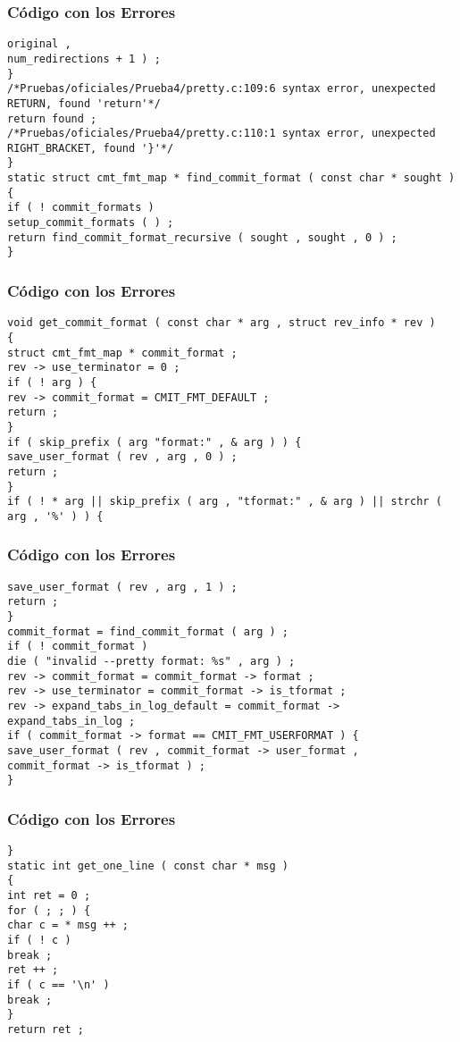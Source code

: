 \documentclass{beamer}
\begin{document}
\begin{frame}[fragile]
\frametitle{C\'odigo con los Errores}
\begin{verbatim}
original , 
num_redirections + 1 ) ; 
} 
/*Pruebas/oficiales/Prueba4/pretty.c:109:6 syntax error, unexpected RETURN, found 'return'*/
return found ; 
/*Pruebas/oficiales/Prueba4/pretty.c:110:1 syntax error, unexpected RIGHT_BRACKET, found '}'*/
} 
static struct cmt_fmt_map * find_commit_format ( const char * sought ) 
{ 
if ( ! commit_formats ) 
setup_commit_formats ( ) ; 
return find_commit_format_recursive ( sought , sought , 0 ) ; 
} 
\end{verbatim}
\end{frame}
\begin{frame}[fragile]
\frametitle{C\'odigo con los Errores}
\begin{verbatim}
void get_commit_format ( const char * arg , struct rev_info * rev ) 
{ 
struct cmt_fmt_map * commit_format ; 
rev -> use_terminator = 0 ; 
if ( ! arg ) { 
rev -> commit_format = CMIT_FMT_DEFAULT ; 
return ; 
} 
if ( skip_prefix ( arg "format:" , & arg ) ) { 
save_user_format ( rev , arg , 0 ) ; 
return ; 
} 
if ( ! * arg || skip_prefix ( arg , "tformat:" , & arg ) || strchr ( arg , '%' ) ) { 
\end{verbatim}
\end{frame}
\begin{frame}[fragile]
\frametitle{C\'odigo con los Errores}
\begin{verbatim}
save_user_format ( rev , arg , 1 ) ; 
return ; 
} 
commit_format = find_commit_format ( arg ) ; 
if ( ! commit_format ) 
die ( "invalid --pretty format: %s" , arg ) ; 
rev -> commit_format = commit_format -> format ; 
rev -> use_terminator = commit_format -> is_tformat ; 
rev -> expand_tabs_in_log_default = commit_format -> expand_tabs_in_log ; 
if ( commit_format -> format == CMIT_FMT_USERFORMAT ) { 
save_user_format ( rev , commit_format -> user_format , 
commit_format -> is_tformat ) ; 
} 
\end{verbatim}
\end{frame}
\begin{frame}[fragile]
\frametitle{C\'odigo con los Errores}
\begin{verbatim}
} 
static int get_one_line ( const char * msg ) 
{ 
int ret = 0 ; 
for ( ; ; ) { 
char c = * msg ++ ; 
if ( ! c ) 
break ; 
ret ++ ; 
if ( c == '\n' ) 
break ; 
} 
return ret ; 
\end{verbatim}
\end{frame}
\end{document}
